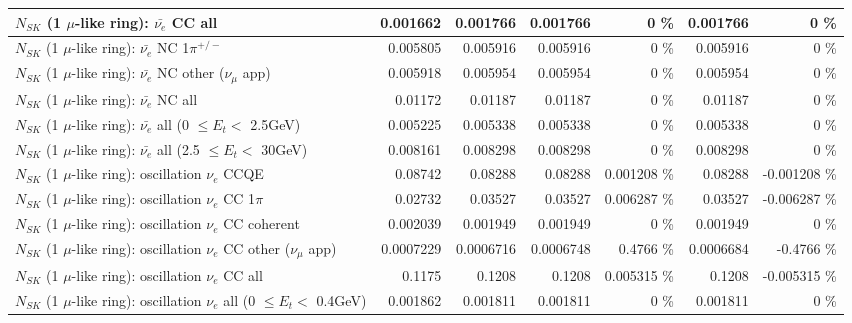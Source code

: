 \begin{table}
\begin{tabular}{| l | r | r | r  r | r  r |}
                            $N_{SK}$ (1 $\mu$-like ring): $\bar{\nu_{e}}$ CC all &        0.001662 &        0.001766 &        0.001766 &        0 \%  &        0.001766 &        0 \%  \\ 
\hline
                     $N_{SK}$ (1 $\mu$-like ring): $\bar{\nu_e}$ NC 1$\pi^{+/-}$ &        0.005805 &        0.005916 &        0.005916 &        0 \%  &        0.005916 &        0 \%  \\ 
            $N_{SK}$ (1 $\mu$-like ring): $\bar{\nu_e}$ NC other ($\nu_\mu$ app) &        0.005918 &        0.005954 &        0.005954 &        0 \%  &        0.005954 &        0 \%  \\ 
                            $N_{SK}$ (1 $\mu$-like ring): $\bar{\nu_{e}}$ NC all &         0.01172 &         0.01187 &         0.01187 &        0 \%  &         0.01187 &        0 \%  \\ 
\hline
     $N_{SK}$ (1 $\mu$-like ring): $\bar{\nu_{e}}$ all (0 $\leq E_{t} <$ 2.5GeV) &        0.005225 &        0.005338 &        0.005338 &        0 \%  &        0.005338 &        0 \%  \\ 
    $N_{SK}$ (1 $\mu$-like ring): $\bar{\nu_{e}}$ all (2.5 $\leq E_{t} <$ 30GeV) &        0.008161 &        0.008298 &        0.008298 &        0 \%  &        0.008298 &        0 \%  \\ 
\hline
\hline
\hline
                          $N_{SK}$ (1 $\mu$-like ring): oscillation $\nu_e$ CCQE &         0.08742 &         0.08288 &         0.08288 & 0.001208 \%  &         0.08288 & -0.001208 \%  \\ 
                     $N_{SK}$ (1 $\mu$-like ring): oscillation $\nu_e$ CC 1$\pi$ &         0.02732 &         0.03527 &         0.03527 & 0.006287 \%  &         0.03527 & -0.006287 \%  \\ 
                   $N_{SK}$ (1 $\mu$-like ring): oscillation $\nu_e$ CC coherent &        0.002039 &        0.001949 &        0.001949 &        0 \%  &        0.001949 &        0 \%  \\ 
      $N_{SK}$ (1 $\mu$-like ring): oscillation $\nu_e$ CC other ($\nu_\mu$ app) &       0.0007229 &       0.0006716 &       0.0006748 &   0.4766 \%  &       0.0006684 &  -0.4766 \%  \\ 
                       $N_{SK}$ (1 $\mu$-like ring): oscillation $\nu_e$  CC all &          0.1175 &          0.1208 &          0.1208 & 0.005315 \%  &          0.1208 & -0.005315 \%  \\ 
\hline
$N_{SK}$ (1 $\mu$-like ring): oscillation $\nu_{e}$ all (0 $\leq E_{t} <$ 0.4GeV) &        0.001862 &        0.001811 &        0.001811 &        0 \%  &        0.001811 &        0 \%  \\ 

\end{tabular}
\end{table}
